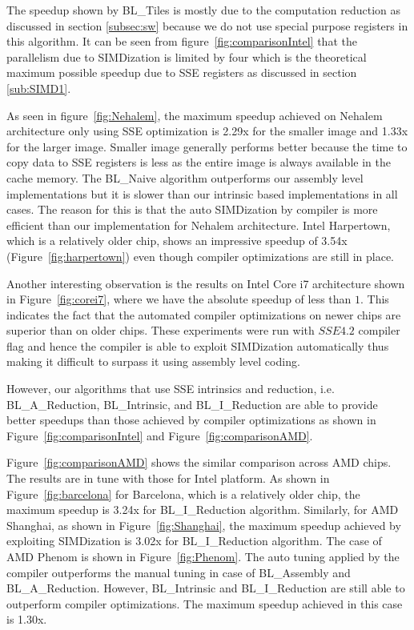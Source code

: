 \documentclass{IEEEtran}
\begin{document}
The speedup shown by BL\_Tiles is mostly due to the computation reduction as discussed in section \ref{subsec:sw} because we do not use special purpose registers in this algorithm. It can be seen from figure~\ref{fig:comparisonIntel} that the parallelism due to SIMDization is limited by four which is the theoretical maximum possible speedup due to SSE registers as discussed in section \ref{sub:SIMD1}.

As seen in figure~\ref{fig:Nehalem}, the maximum speedup achieved on Nehalem architecture only using SSE optimization is 2.29x for the smaller image and 1.33x for the larger image. Smaller image generally performs better because the time to copy data to SSE registers is less as the entire image is always available in the cache memory. The BL\_Naive algorithm outperforms our assembly level implementations but it is slower than our intrinsic based implementations in all cases. The reason for this is that the auto SIMDization by compiler is more efficient than our implementation for Nehalem architecture. Intel Harpertown, which is a relatively older chip, shows an impressive speedup of 3.54x (Figure~\ref{fig:harpertown}) even though compiler optimizations are still in place. 

Another interesting observation is the results on Intel Core i7 architecture shown in Figure~\ref{fig:corei7}, where we have the absolute speedup of less than $1$. This indicates the fact that the automated compiler optimizations on newer chips are superior than on older chips. These experiments were run with $SSE4.2$ compiler flag and hence the compiler is able to exploit SIMDization automatically thus making it difficult to surpass it using assembly level coding. 

However, our algorithms that use SSE intrinsics and reduction, i.e. BL\_A\_Reduction, BL\_Intrinsic, and BL\_I\_Reduction are able to provide better speedups than those achieved by compiler optimizations as shown in Figure~\ref{fig:comparisonIntel} and Figure~\ref{fig:comparisonAMD}.

Figure~\ref{fig:comparisonAMD} shows the similar comparison across AMD chips. The results are in tune with those for Intel platform. As shown in Figure~\ref{fig:barcelona} for Barcelona, which is a relatively older chip, the maximum speedup is 3.24x for BL\_I\_Reduction algorithm. Similarly, for AMD Shanghai, as shown in Figure~\ref{fig:Shanghai}, the maximum speedup achieved by exploiting SIMDization is 3.02x for BL\_I\_Reduction algorithm. The case of AMD Phenom is shown in Figure~\ref{fig:Phenom}. The auto tuning applied by the compiler outperforms the manual tuning in case of BL\_Assembly and BL\_A\_Reduction. However, BL\_Intrinsic and BL\_I\_Reduction are still able to outperform compiler optimizations. The maximum speedup achieved in this case is 1.30x.
\end{document}
